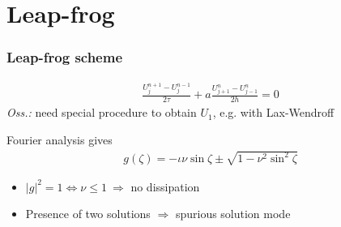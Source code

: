 \documentclass{beamer}
\begin{document}
\section{Leap-frog}
\begin{frame}
\frametitle{Leap-frog scheme}
\begin{align*}
\frac{U_j^{n+1} - U_j^{n-1}}{2\tau} + a \frac{U_{j+1}^n-U_{j-1}^n}{2h} = 0
\end{align*}
\textit{Oss.:} need special procedure to obtain $U_1$, e.g. with Lax-Wendroff \\
\end{frame}
\begin{frame}
Fourier analysis gives
\begin{align*}
g(\zeta) = -\iota\nu\sin{\zeta} \pm \sqrt{1 - \nu^2\sin^2{\zeta}}
\end{align*}
\begin{itemize}
\setlength\itemsep{1em}
\item $|g|^2 = 1 \iff \nu \leq 1 \ \Rightarrow$ no dissipation
\item Presence of two solutions $\Rightarrow$ spurious solution mode
\end{itemize}
\end{frame}
\end{document}
